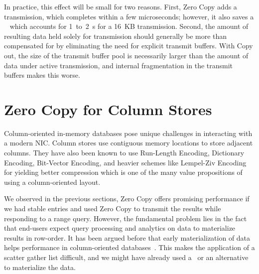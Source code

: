 In practice, this effect will be small for two reasons. First, Zero Copy adds a
transmission, which completes within a few microseconds; however, it also saves a
\memcpy~ which accounts for 1~to~2~\textmu s for a 16~KB transmission. Second, the
amount of resulting data held solely for transmission should generally be
more than compensated for by eliminating the need for explicit transmit
buffers. With Copy out, the size of the transmit buffer pool is necessarily
larger than the amount of data under active transmission, and internal
fragmentation in the transmit buffers makes this worse.


\section{Zero Copy for Column Stores}

Column-oriented in-memory databases pose unique challenges in interacting with a modern NIC. 
Column stores use contiguous memory locations to store adjacent columns. They have also been known 
to use Run-Length Encoding, Dictionary Encoding, Bit-Vector Encoding, and heavier schemes 
like Lempel-Ziv Encoding for yielding better compression which is one of the many value 
propositions of using a column-oriented layout. 

We observed in the previous  sections, Zero Copy offers promising performance if 
we had stable entries and used Zero Copy to transmit the results while responding to a range query. 
However, the fundamental problem lies in the fact that end-users expect query processing and analytics on data 
to materialize results in row-order. It has been argued before that early materialization of data
helps performance in column-oriented databases~\cite{cstore-material}. This makes the application 
of a scatter gather list difficult, and we might have already used a \memcpy ~or an alternative 
to materialize the data. 

